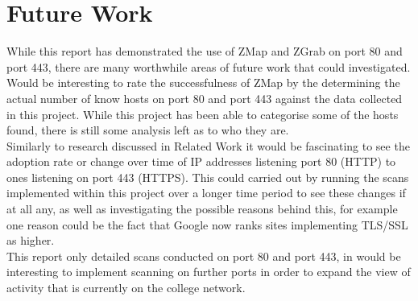 \documentclass[a4wide,leqno,12pt]{report}
\begin{document}
\chapter{Future Work}
While this report has demonstrated the use of ZMap and ZGrab on port 80 and port 443, there are many worthwhile areas of future work that could investigated.\\

Would be interesting to rate the successfulness of ZMap by the determining the actual number of know hosts on port 80 and port 443 against the data collected in this project. While this project has been able to categorise some of the hosts found, there is still some analysis left as to who they are.\\

Similarly to research discussed in Related Work \cite{durumeric2013zmap} \cite{durumeric2013analysis} it would be fascinating to see the adoption rate or change over time of IP addresses listening port 80 (HTTP) to ones listening on port 443 (HTTPS). This could carried out by running the scans implemented within this project over a longer time period to see these changes if at all any, as well as investigating the possible reasons behind this, for example one reason could be the fact that Google now ranks sites implementing TLS/SSL as higher.\\


This report only detailed scans conducted on port 80 and port 443, in would be interesting to implement scanning on further ports in order to expand the view of activity that is currently on the college network.\\
\end{document}

